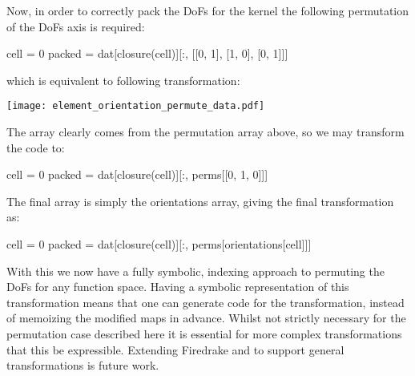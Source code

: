 \documentclass[thesis]{subfiles}
\begin{document}
Now, in order to correctly pack the DoFs for the kernel the following permutation of the DoFs axis is required:
\begin{pyinline}
  cell = 0
  packed = dat[closure(cell)][:, [[0, 1], [1, 0], [0, 1]]]
\end{pyinline}
which is equivalent to following transformation:
\begin{center}
  \texttt{[image: element\_orientation\_permute\_data.pdf]}
\end{center}

The array \pycode{[[0, 1], [1, 0], [0, 1]]} clearly comes from the permutation array above, so we may transform the code to:
\begin{pyinline}
  cell = 0
  packed = dat[closure(cell)][:, perms[[0, 1, 0]]]
\end{pyinline}
The final array \pycode{[0, 1, 0]} is simply the orientations array, giving the final transformation as:
\begin{pyinline}
  cell = 0
  packed = dat[closure(cell)][:, perms[orientations[cell]]]
\end{pyinline}

With this we now have a fully symbolic, indexing approach to permuting the DoFs for any function space.
Having a symbolic representation of this transformation means that one can generate code for the transformation, instead of memoizing the modified maps in advance.
Whilst not strictly necessary for the permutation case described here it is essential for more complex transformations that this be expressible.
Extending Firedrake and  to support general transformations is future work.
\end{document}
